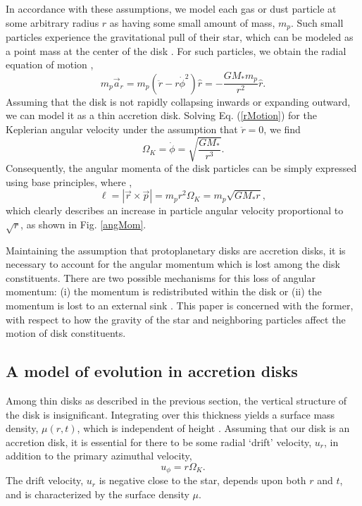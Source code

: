 \documentclass[aps,pra, twocolumn]{revtex4-1}
\begin{document}
In accordance with these assumptions, we model each gas or dust particle at some arbitrary radius $r$ as having some small amount of mass, $m_p$.  Such small particles experience the gravitational pull of their star, which can be modeled  as a point mass at the center of the disk \cite{armitage2011}.  For such particles, we obtain the radial equation of motion \cite{taylor2005},
\begin{equation}
m_p \vec{a}_r = m_p ( \ddot{r} - r\dot{\phi}^2 )\hat{r} = - \frac{G M_* m_p}{r^2}\hat{r} . \label{rMotion}
\end{equation}
Assuming that the disk is not rapidly collapsing inwards or expanding outward, we can model it as a thin accretion disk.  Solving Eq. (\ref{rMotion}) for the Keplerian angular velocity under the assumption that $\ddot{r} = 0$, we find \cite{armitage2011}
\begin{equation}
 \Omega_K = \dot{\phi} = \sqrt{\frac{G M_*}{r^3}}.
\end{equation}
Consequently, the angular momenta of the disk particles can be simply expressed using base principles, where \cite{taylor2005},
\begin{equation}
\ell = \left| \vec{r} \times \vec{p} \right| = m_p r^2 \Omega_K = m_p \sqrt{G M_* r}, \label{angMomEq}
\end{equation}
which clearly describes an increase in particle angular velocity proportional to $\sqrt{r}$, as shown in Fig. \ref{angMom}.  

Maintaining the assumption that protoplanetary disks are accretion disks, it is necessary to account for the angular momentum which is lost among the disk constituents.  There are two possible mechanisms for this loss of angular momentum: (i) the momentum is redistributed within the disk or (ii) the momentum is lost to an external sink \cite{armitage2011}.  This paper is concerned with the former, with respect to how the gravity of the star and neighboring particles affect the motion of disk constituents.



\subsection{\label{section2.1} A model of evolution in accretion disks }
Among thin disks as described in the previous section, the vertical structure of the disk is insignificant.  Integrating over this thickness yields a surface mass density, $\mu(r, t)$, which is independent of height  \cite{armitage2011}.  Assuming that our disk is an accretion disk, it is essential for there to be some radial `drift' velocity, $u_r$, in addition to the primary azimuthal velocity,
\begin{equation}
u_\phi = r\Omega_K. \nonumber
\end{equation}
The drift velocity, $u_r$ is negative close to the star, depends upon both $r$ and $t$, and is characterized by the surface density $\mu$.
\end{document}
